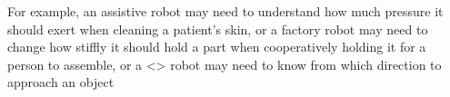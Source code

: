 For example, an assistive robot may need to understand how much pressure it should exert when cleaning a patient's skin,
or a factory robot may need to change how stiffly it should hold a part when cooperatively holding it for a person to assemble,
or a <> robot may need to know from which direction to approach an object
